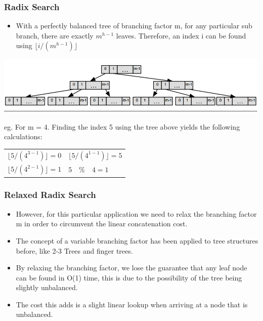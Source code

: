\documentclass{beamer}
\begin{document}
\begin{frame}
\frametitle{Radix Search}

	\begin{itemize}
	
		\item With a perfectly balanced tree of branching factor m, for any particular sub branch, there are exactly $m^{h-1}$  leaves. Therefore, an index i can be found using $\lfloor i / (m^{h-1}) \rfloor$ \citep{angle1999radix}
	\end{itemize}
	\begin{center}
	
	\includegraphics[scale=0.25]{radixbalancedtree.png}
	
	\end{center}
	\pause
	eg. For m = 4. Finding the index 5 using the tree above yields the following calculations:
	\begin{tabular}{l l}
	
	$\lfloor 5 / (4^{3-1}) \rfloor = 0$ & $ \lfloor 5 / (4^{1-1}) \rfloor = 5 $ \\
	$\lfloor 5 / (4^{2-1}) \rfloor = 1$ & $ 5 \quad \% \quad 4 = 1 $ \\
	
	\end{tabular}		

\end{frame}


\begin{frame}
\frametitle{Relaxed Radix Search}

	\begin{itemize}
		\item However, for this particular application we need to relax the branching factor m in order to circumvent the linear concatenation cost. \pause
		\item The concept of a variable branching factor has been applied to tree structures before, like 2-3 Trees and finger trees\citep{hinze2006finger}. \pause
		\item By relaxing the branching factor, we lose the guarantee that any leaf node can be found in O(1) time, this is due to the possibility of the tree being slightly unbalanced. \pause
		\item The cost this adds is a slight linear lookup when arriving at a node that is unbalanced.
	
	\end{itemize}

\end{frame}
\end{document}
